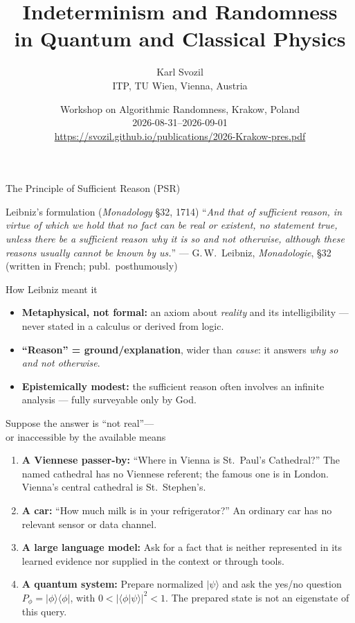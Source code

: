\documentclass{beamer}
\title{Indeterminism and Randomness\\ in Quantum and Classical Physics}
\author{\texorpdfstring{Karl Svozil\\ITP, TU Wien, Vienna, Austria}%
{Karl Svozil, ITP, TU Wien, Vienna, Austria}}
\date{Workshop on Algorithmic Randomness, Krakow, Poland\\
2026-08-31--2026-09-01\\
\url{https://svozil.github.io/publications/2026-Krakow-pres.pdf}}
\begin{document}
\begin{frame}
\titlepage
\end{frame}

\begin{frame}{The Principle of Sufficient Reason (PSR)}

\begin{block}{Leibniz's formulation (\emph{Monadology} {\S}32, 1714)}
\small
\enquote{\textit{And that of sufficient reason, in virtue of which we hold
that no fact can be real or existent, no statement true, unless there be a
sufficient reason why it is so and not otherwise, although these reasons
usually cannot be known by us.}}
\vskip2pt
\hfill\footnotesize --- G.\,W.\ Leibniz, \emph{Monadologie}, {\S}32
(written in French; publ.\ posthumously)
\end{block}

\vspace{-0.2em}
\begin{exampleblock}{How Leibniz meant it}
\small
\begin{itemize}
  \item \textbf{Metaphysical, not formal:} an axiom about \emph{reality} and
        its intelligibility --- never stated in a calculus or derived from
        logic.
  \item \textbf{\enquote{Reason} = ground/explanation}, wider than
        \emph{cause}: it answers \emph{why so and not otherwise}.
  \item \textbf{Epistemically modest:} the sufficient reason often involves an
        infinite analysis --- fully surveyable only by God.
\end{itemize}
\end{exampleblock}

\end{frame}

\begin{frame}{Suppose the answer is ``not real''---\\
or inaccessible by the available means}
\small
\begin{enumerate}
  \setlength{\itemsep}{0.55em}
  \item \textbf{A Viennese passer-by:}
        \enquote{Where in Vienna is St.~Paul's Cathedral?}
        The named cathedral has no Viennese referent; the famous one is in
        London. Vienna's central cathedral is St.~Stephen's.
  \item \textbf{A car:}
        \enquote{How much milk is in your refrigerator?}
        An ordinary car has no relevant sensor or data channel.
  \item \textbf{A large language model:}
        Ask for a fact that is neither represented in its learned evidence nor
        supplied in the context or through tools.
  \item \textbf{A quantum system:}
        Prepare normalized $\lvert\psi\rangle$ and ask the yes/no question
        $P_\phi=\lvert\phi\rangle\!\langle\phi\rvert$, with
        $0<\lvert\langle\phi\vert\psi\rangle\rvert^2<1$.
        The prepared state is not an eigenstate of this query.
\end{enumerate}
\end{frame}
\end{document}
